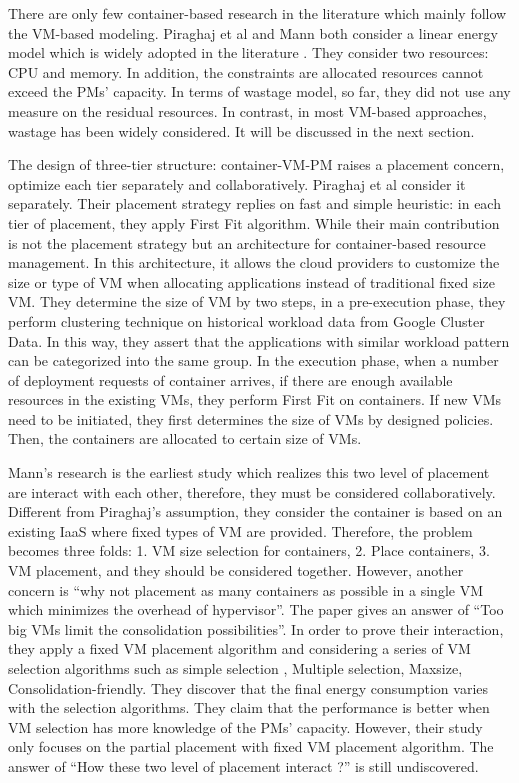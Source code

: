 There are only few container-based research in the literature which mainly follow the VM-based modeling. Piraghaj et al \cite{Piraghaj:2016bw} and Mann \cite{Mann:2016hx} both consider a linear energy model which is widely adopted in the literature \cite{Xavier:2017jl}. They consider two resources: CPU and memory. In addition, the constraints are allocated resources cannot exceed the PMs' capacity. In terms of wastage model, so far, they did not use any measure on the residual resources. In contrast, in most VM-based approaches, wastage has been widely considered. It will be discussed in the next section.  

The design of three-tier structure: container-VM-PM raises a placement concern, optimize each tier separately and collaboratively.
Piraghaj et al \cite{Piraghaj:2016bw} consider it separately. Their placement strategy replies on fast and simple heuristic: in each tier of placement, they apply First Fit algorithm. While their main contribution is not the placement strategy but an architecture for container-based resource management. In this architecture, it allows the cloud providers to customize the size or type of VM when allocating applications instead of traditional fixed size VM. They determine the size of VM by two steps, in a pre-execution phase, they perform clustering technique on historical workload data from Google Cluster Data. In this way, they assert that the applications with similar workload pattern can be categorized into the same group. In the execution phase, when a number of deployment requests of container arrives, if there are enough available resources in the existing VMs, they perform First Fit on containers. If new VMs need to be initiated, they first determines the size of VMs by designed policies. Then, the containers are allocated to certain size of VMs. 

Mann's research \cite{Mann:2016hx} is the earliest study which realizes this two level of placement are interact with each other, therefore, they must be considered collaboratively. Different from Piraghaj's assumption, they consider the container is based on an existing IaaS where fixed types of VM are provided. Therefore, the problem becomes three folds: 1. VM size selection for containers, 2. Place containers, 3. VM placement, and they should be considered together. However, another concern is ``why not placement as many containers as possible in a single VM which minimizes the overhead of hypervisor''. The paper gives an answer of ``Too big VMs limit the consolidation possibilities''.  In order to prove their interaction, they apply a fixed VM placement algorithm and considering a series of VM selection algorithms such as simple selection \cite{Ganesan:2012eb},  Multiple selection, Maxsize, Consolidation-friendly. They discover that the final energy consumption varies with the selection algorithms. They claim that the performance is better when VM selection has more knowledge of the PMs' capacity. However, their study only focuses on the partial placement with fixed VM placement algorithm. The answer of ``How these two level of placement interact ?'' is still undiscovered.

